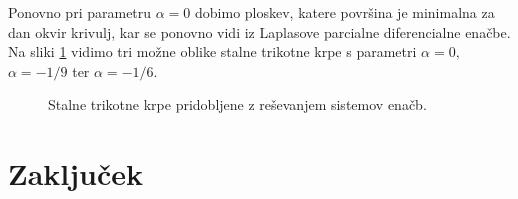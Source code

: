 \documentclass[a4paper,12pt]{article}
\begin{document}
Ponovno pri parametru $\alpha = 0$ dobimo ploskev, 
katere površina je minimalna za dan okvir krivulj, kar se ponovno vidi iz 
Laplasove parcialne diferencialne enačbe.
Na sliki \ref{fig:trikotne} vidimo tri možne oblike stalne trikotne
krpe s parametri $\alpha = 0,$ $\alpha = -1/9$ ter $\alpha = -1/6$.
\begin{figure}[ht!]
   \centering
   
   \caption{Stalne trikotne krpe pridobljene z reševanjem sistemov enačb.}
\label{fig:trikotne}
\end{figure}

\section{Zaključek}
\end{document}
